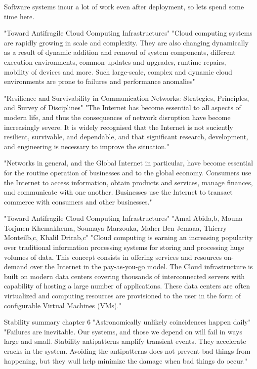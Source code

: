{Software systems incur a lot of work even after deployment, so lets spend some time here.

"Toward Antifragile Cloud Computing Infrastructures"\cite{abid2014toward}
"Cloud computing systems are rapidly growing in scale and complexity. They are also changing dynamically as a result of dynamic addition and removal of system components, different execution environments, common updates and upgrades, runtime repairs, mobility of devices and more. Such large-scale, complex and dynamic cloud environments are prone to failures and performance anomalies"

"Resilience and Survivability in Communication Networks: Strategies, Principles, and Survey of Disciplines"\cite{sterbenz2010resilience}
"The Internet has become essential to all aspects of modern life, and thus the consequences of network disruption have become increasingly severe. It is widely recognised that the Internet is not suciently resilient, survivable, and dependable, and that significant research, development, and engineering is necessary to improve the situation."

"Networks in general, and the Global Internet in particular, have become essential for the routine operation of businesses and to the global economy. Consumers use the Internet to access information, obtain products and services, manage finances, and communicate with one another. Businesses use the Internet to transact commerce with consumers and other businesses."


"Toward Antifragile Cloud Computing Infrastructures" "Amal Abida,b, Mouna Torjmen Khemakhema, Soumaya Marzouka, Maher Ben Jemaaa, Thierry Monteilb,c, Khalil Drirab,c"
"Cloud computing is earning an increasing popularity over traditional information processing systems for storing and processing huge volumes of data. This concept consists in offering services and resources on-demand over the Internet in the pay-as-you-go model. The Cloud infrastructure is built on modern data centers covering thousands of interconnected servers with capability of hosting a large number of applications. These data centers are often virtualized and computing resources are provisioned to the user in the form of configurable Virtual Machines (VMs)."

Stability summary chapter 6 \cite[p. 117]{nygard2007release}
"Astronomically unlikely coincidences happen daily"
"Failures are inevitable. Our systems, and those we depend on will fail in ways large and small. Stability antipatterns amplify transient events. They accelerate cracks in the system. Avoiding the antipatterns does not prevent bad things from happening, but they wull help minimize the damage when bad things do occur."


}
